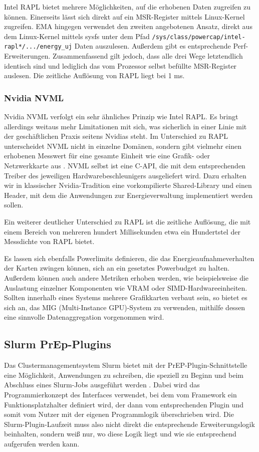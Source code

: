 \documentclass[paper=a4, fontsize=11pt]{scrartcl} %
\numberwithin{equation}{section} %
\numberwithin{figure}{section} %
\numberwithin{table}{section} %
\begin{document}
Intel RAPL bietet mehrere Möglichkeiten, auf die erhobenen Daten zugreifen zu können. Einerseits lässt sich direkt auf ein MSR-Register mittels Linux-Kernel zugreifen. EMA hingegen verwendet den zweiten angebotenen Ansatz, direkt aus dem Linux-Kernel mittels sysfs unter dem Pfad \texttt{/sys/class/powercap/intel-rapl*/.../energy\_uj} Daten auszulesen. Außerdem gibt es entsprechende Perf-Erweiterungen. Zusammenfassend gilt jedoch, dass alle drei Wege letztendlich identisch sind und lediglich das vom Prozessor selbst befüllte MSR-Register auslesen. Die zeitliche Auflösung von RAPL liegt bei 1 ms.
\subsubsection{Nvidia NVML}
Nvidia NVML verfolgt ein sehr ähnliches Prinzip wie Intel RAPL. Es bringt allerdings weitaus mehr Limitationen mit sich, was sicherlich in einer Linie mit der geschäftlichen Praxis seitens Nvidias steht. Im Unterschied zu RAPL unterscheidet NVML nicht in einzelne Domänen, sondern gibt vielmehr einen erhobenen Messwert für eine gesamte Einheit wie eine Grafik- oder Netzwerkkarte aus \cite{wassermann2026nvmlgpm}. NVML selbst ist eine C-API, die mit dem entsprechenden Treiber des jeweiligen Hardwarebeschleunigers ausgeliefert wird. Dazu erhalten wir in klassischer Nvidia-Tradition eine vorkompilierte Shared-Library und einen Header, mit dem die Anwendungen zur Energieverwaltung implementiert werden sollen.

Ein weiterer deutlicher Unterschied zu RAPL ist die zeitliche Auflösung, die mit einem Bereich von mehreren hundert Millisekunden etwa ein Hundertstel der Messdichte von RAPL bietet.

Es lassen sich ebenfalls Powerlimits definieren, die das Energieaufnahmeverhalten der Karten zwingen können, sich an ein gesetztes Powerbudget zu halten. Außerdem können auch andere Metriken erhoben werden, wie beispielsweise die Auslastung einzelner Komponenten wie VRAM oder SIMD-Hardwareeinheiten. Sollten innerhalb eines Systems mehrere Grafikkarten verbaut sein, so bietet es sich an, das MIG (Multi-Instance GPU)-System zu verwenden, mithilfe dessen eine sinnvolle Datenaggregation vorgenommen wird.
\subsection{Slurm PrEp-Plugins}
Das Clustermanagementsystem Slurm bietet mit der PrEP-Plugin-Schnittstelle eine Möglichkeit, Anwendungen zu schreiben, die speziell zu Beginn und beim Abschluss eines Slurm-Jobs ausgeführt werden \cite{slurmprep}. Dabei wird das Programmierkonzept des Interfaces verwendet, bei dem vom Framework ein Funktionsplatzhalter definiert wird, der dann vom entsprechenden Plugin und somit vom Nutzer mit der eigenen Programmlogik überschrieben wird. Die Slurm-Plugin-Laufzeit muss also nicht direkt die entsprechende Erweiterungslogik beinhalten, sondern weiß nur, wo diese Logik liegt und wie sie entsprechend aufgerufen werden kann.
\end{document}
